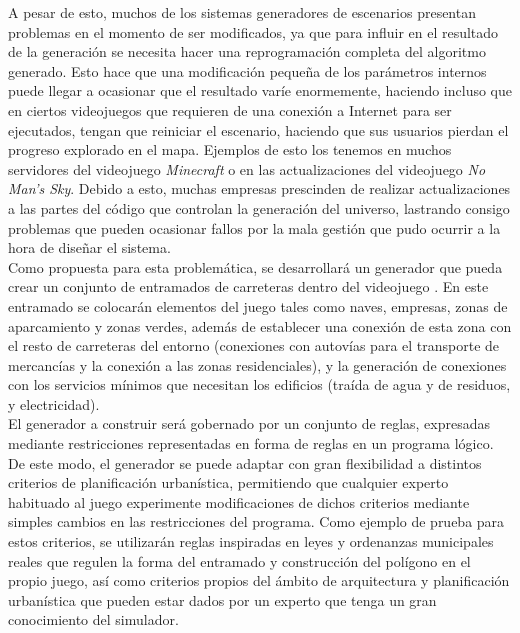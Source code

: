 A pesar de esto, muchos de los sistemas generadores de escenarios presentan problemas en el momento de ser modificados, ya que para influir en el resultado de la generación se necesita hacer una reprogramación completa del algoritmo generado. Esto hace que una modificación pequeña de los parámetros internos puede llegar a ocasionar que el resultado varíe enormemente, haciendo incluso que en ciertos videojuegos que requieren de una conexión a Internet para ser ejecutados, tengan que reiniciar el escenario, haciendo que sus usuarios pierdan el progreso explorado en el mapa. Ejemplos de esto los tenemos en muchos servidores del videojuego \textit{Minecraft} o en las actualizaciones del videojuego \textit{No Man's Sky}. Debido a esto, muchas empresas prescinden de realizar actualizaciones a las partes del código que controlan la generación del universo, lastrando consigo problemas que pueden ocasionar fallos por la mala gestión que pudo ocurrir a la hora de diseñar el sistema. \\

Como propuesta para esta problemática, se desarrollará un generador que pueda crear un conjunto de entramados de carreteras dentro del videojuego \cities. En este entramado se colocarán elementos del juego tales como naves, empresas, zonas de aparcamiento y zonas verdes, además de establecer una conexión de esta zona con el resto de carreteras del entorno (conexiones con autovías para el transporte de mercancías y la conexión a las zonas residenciales), y la generación de conexiones con los servicios mínimos que necesitan los edificios (traída de agua y de residuos, y electricidad). \\

El generador a construir será gobernado por un conjunto de reglas, expresadas mediante restricciones representadas en forma de reglas en un programa lógico. De este modo, el generador se puede adaptar con gran flexibilidad a distintos criterios de planificación urbanística, permitiendo que cualquier experto habituado al juego experimente modificaciones de dichos criterios mediante simples cambios en las restricciones del programa. Como ejemplo de prueba para estos criterios, se utilizarán reglas inspiradas en leyes y ordenanzas municipales reales \cite{guia_galicia} que regulen la forma del entramado y construcción del polígono en el propio juego, así como criterios propios del ámbito de arquitectura y planificación urbanística que pueden estar dados por un experto que tenga un gran conocimiento del simulador. \\

